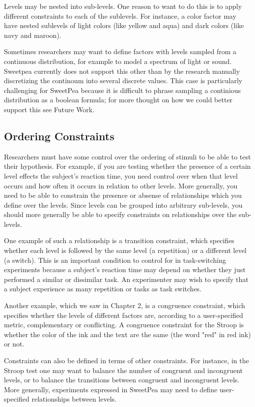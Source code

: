 Levels may be nested into sub-levels. One reason to want to do this is to apply different constraints to each of the sublevels. For instance, a color factor may have nested sublevels of light colors (like yellow and aqua) and dark colors (like navy and maroon).

Sometimes researchers may want to define factors with levels sampled from a continuous distribution, for example to model a spectrum of light or sound. Sweetpea currently does not support this other than by the research manually discretizing the continoum into several discrete values. This case is particularly challenging for SweetPea because it is difficult to phrase sampling a continious distribution as a boolean formula; for more thought on how we could better support this see Future Work.

\subsection{Ordering Constraints}

Researchers must have some control over the ordering of stimuli to be able to test their hypothesis. For example, if you are testing whether the presence of a certain level effects the subject's reaction time, you need control over when that level occurs and how often it occurs in relation to other levels. More generally, you need to be able to constrain the presence or absense of relationships which you define over the levels. Since levels can be grouped into arbitrary sub-levels, you should more generally be able to specify constraints on relationships over the sub-levels.

One example of such a relationship is a transition constraint, which specifies whether each level is followed by the same level (a repetition) or a different level (a switch). This is an important condition to control for in task-switching experiments because a subject's reaction time may depend on whether they just performed a similar or dissimilar task. An experimenter may wish to specify that a subject experience as many repetition or tasks as task switches.

Another example, which we saw in Chapter 2, is a congruence constraint, which specifies whether the levels of different factors are, according to a user-specified metric, complementary or conflicting. A congruence constraint for the Stroop is whether the color of the ink and the text are the same (the word "red" in red ink) or not.

Constraints can also be defined in terms of other constraints. For instance, in the Stroop test one may want to balance the number of congruent and incongruent levels, or to balance the transitions between congruent and incongruent levels. More generally, experiments expressed in SweetPea may need to define user-specified relationships between levels.

